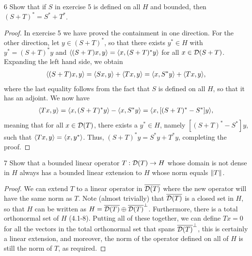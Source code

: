 \begin{exercise}{6}
Show that if $S$ in exercise 5 is defined on all $H$ and bounded, then $(S + T)^\ast = S^\ast + T^\ast$.
\end{exercise}
\begin{proof}
In exercise 5 we have proved the containment in one direction.
For the other direction, let $y \in (S + T)^\ast$, so that there exists $y^\ast \in H$ with $y^\ast = (S + T)^\ast y$ and $\langle (S + T)x, y\rangle = \langle x, (S + T)^\ast y\rangle$ for all $x \in \mathcal{D}(S + T)$.
Expanding the left hand side, we obtain
\begin{align*}
    \langle (S + T)x, y\rangle
    = \langle Sx, y\rangle + \langle Tx, y\rangle
    = \langle x, S^\ast y\rangle + \langle Tx, y\rangle,
\end{align*}
where the last equality follows from the fact that $S$ is defined on all $H$, so that it has an adjoint. 
We now have
\begin{align*}
    \langle Tx, y\rangle
    = \langle x, (S + T)^\ast y\rangle - \langle x, S^\ast y\rangle
    = \langle x, [(S + T)^\ast - S^\ast] y\rangle,
\end{align*}
meaning that for all $x \in \mathcal{D}(T)$, there exists a $y^\ast \in H$, namely $[(S + T)^\ast - S^\ast] y$, such that $\langle Tx, y\rangle = \langle x, y^\ast\rangle$.
Thus, $(S + T)^\ast y = S^\ast y+ T^\ast y$, completing the proof.
\end{proof} 

\begin{exercise}{7}
Show that a bounded linear operator $T: \mathcal{D}(T) \to H$ whose domain is not dense in $H$ always has a bounded linear extension to $H$ whose norm equals $\left\lVert T\right\rVert$.
\end{exercise}
\begin{proof}
We can extend $T$ to a linear operator in $\overline{\mathcal{D}(T)}$ where the new operator will have the same norm as $T$.
Note (almost trivially) that $\overline{\mathcal{D}(T)}$ is a closed set in $H$, so that $H$ can be written as $H = \overline{\mathcal{D}(T)} \oplus \overline{\mathcal{D}(T)}^\perp$.
Furthermore, there is a total orthonormal set of $H$ (4.1-8).
Putting all of these together, we can define $T x = 0$ for all the vectors in the total orthonormal set that spans $\overline{\mathcal{D}(T)}^\perp$, this is certainly a linear extension, and moreover, the norm of the operator defined on all of $H$ is still the norm of $T$, as required.
\end{proof} 

